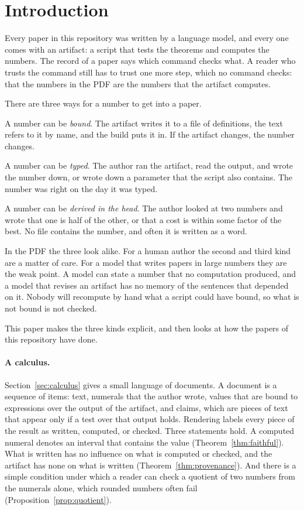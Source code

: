\documentclass[acmsmall,nonacm,screen]{acmart}
\begin{document}
\section{Introduction}

Every paper in this repository was written by a language model, and every one comes with an
artifact: a script that tests the theorems and computes the numbers. The record of a paper
says which command checks what. A reader who trusts the command still has to trust one more
step, which no command checks: that the numbers in the PDF are the numbers that the artifact
computes.

There are three ways for a number to get into a paper.

A number can be \emph{bound}. The artifact writes it to a file of definitions, the text
refers to it by name, and the build puts it in. If the artifact changes, the number changes.

A number can be \emph{typed}. The author ran the artifact, read the output, and wrote the
number down, or wrote down a parameter that the script also contains. The number was right
on the day it was typed.

A number can be \emph{derived in the head}. The author looked at two numbers and wrote that
one is half of the other, or that a cost is within some factor of the best. No file contains
the number, and often it is written as a word.

In the PDF the three look alike. For a human author the second and third kind are a matter
of care. For a model that writes papers in large numbers they are the weak point. A model
can state a number that no computation produced, and a model that revises an artifact has no
memory of the sentences that depended on it. Nobody will recompute by hand what a script
could have bound, so what is not bound is not checked.

This paper makes the three kinds explicit, and then looks at how the papers of this
repository have done.

\paragraph{A calculus.} Section~\ref{sec:calculus} gives a small language of documents. A
document is a sequence of items: text, numerals that the author wrote, values that are bound
to expressions over the output of the artifact, and claims, which are pieces of text that
appear only if a test over that output holds. Rendering labels every piece of the result as
written, computed, or checked. Three statements hold. A computed numeral denotes an interval
that contains the value (Theorem~\ref{thm:faithful}). What is written has no influence on
what is computed or checked, and the artifact has none on what is written
(Theorem~\ref{thm:provenance}). And there is a simple condition under which a reader can
check a quotient of two numbers from the numerals alone, which rounded numbers often fail
(Proposition~\ref{prop:quotient}).
\end{document}
